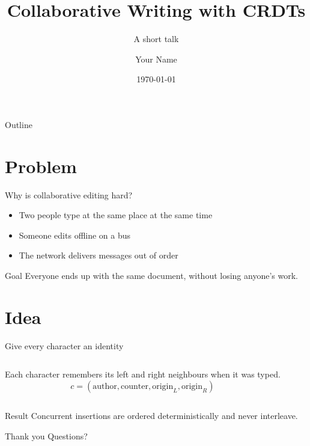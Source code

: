 \documentclass{beamer}
\title{Collaborative Writing with CRDTs}
\subtitle{A short talk}
\author{Your Name}
\institute{University of Chittagong}
\date{\today}
\begin{document}
\begin{frame}
  \titlepage
\end{frame}

\begin{frame}{Outline}
  \tableofcontents
\end{frame}

\section{Problem}
\begin{frame}{Why is collaborative editing hard?}
  \begin{itemize}
    \item Two people type at the same place at the same time
    \item Someone edits offline on a bus
    \item The network delivers messages out of order
  \end{itemize}
  \begin{block}{Goal}
    Everyone ends up with the same document, without losing anyone's work.
  \end{block}
\end{frame}

\section{Idea}
\begin{frame}{Give every character an identity}
  \begin{columns}
      Each character remembers its left and right neighbours when it was typed.
      \[
        c = (\text{author}, \text{counter}, \text{origin}_L, \text{origin}_R)
      \]
  \end{columns}
  \begin{alertblock}{Result}
    Concurrent insertions are ordered deterministically and never interleave.
  \end{alertblock}
\end{frame}

\begin{frame}{Thank you}
  \centering \Large Questions?
\end{frame}
\end{document}
